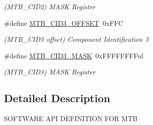 \begin{DoxyCompactItemize}
\begin{DoxyCompactList}\small\item\em (M\+T\+B\+\_\+\+C\+I\+D2) M\+A\+S\+K Register \end{DoxyCompactList}\item 
\hypertarget{group___s_a_m_l21___m_t_b_gac81a28a777cce5ef1678c92438d75ebe}{}\#define \hyperlink{group___s_a_m_l21___m_t_b_gac81a28a777cce5ef1678c92438d75ebe}{M\+T\+B\+\_\+\+C\+I\+D3\+\_\+\+O\+F\+F\+S\+E\+T}~0x\+F\+F\+C\label{group___s_a_m_l21___m_t_b_gac81a28a777cce5ef1678c92438d75ebe}

\begin{DoxyCompactList}\small\item\em (M\+T\+B\+\_\+\+C\+I\+D3 offset) Component Identification 3 \end{DoxyCompactList}\item 
\hypertarget{group___s_a_m_l21___m_t_b_ga1e712ff567cb3de2c31b02bff55545b0}{}\#define \hyperlink{group___s_a_m_l21___m_t_b_ga1e712ff567cb3de2c31b02bff55545b0}{M\+T\+B\+\_\+\+C\+I\+D3\+\_\+\+M\+A\+S\+K}~0x\+F\+F\+F\+F\+F\+F\+F\+Ful\label{group___s_a_m_l21___m_t_b_ga1e712ff567cb3de2c31b02bff55545b0}

\begin{DoxyCompactList}\small\item\em (M\+T\+B\+\_\+\+C\+I\+D3) M\+A\+S\+K Register \end{DoxyCompactList}\end{DoxyCompactItemize}


\subsection{Detailed Description}
S\+O\+F\+T\+W\+A\+R\+E A\+P\+I D\+E\+F\+I\+N\+I\+T\+I\+O\+N F\+O\+R M\+T\+B 